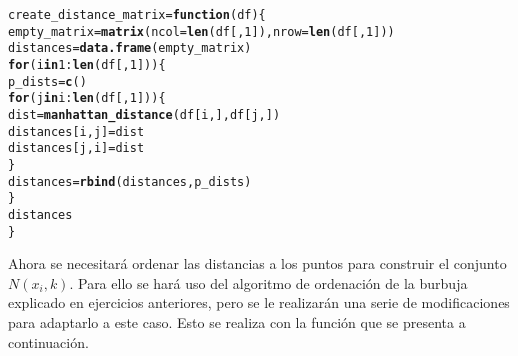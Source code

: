 \documentclass[12pt]{report}\usepackage[]{graphicx}\usepackage[dvipsnames]{xcolor}
\makeatletter
\newcommand{\hlnum}[1]{\textcolor[rgb]{0.686,0.059,0.569}{#1}}%
\newcommand{\hlopt}[1]{\textcolor[rgb]{0,0,0}{#1}}%
\newcommand{\hlstd}[1]{\textcolor[rgb]{0.345,0.345,0.345}{#1}}%
\newcommand{\hlkwa}[1]{\textcolor[rgb]{0.161,0.373,0.58}{\textbf{#1}}}%
\newcommand{\hlkwb}[1]{\textcolor[rgb]{0.69,0.353,0.396}{#1}}%
\newcommand{\hlkwc}[1]{\textcolor[rgb]{0.333,0.667,0.333}{#1}}%
\newcommand{\hlkwd}[1]{\textcolor[rgb]{0.737,0.353,0.396}{\textbf{#1}}}%
\newenvironment{kframe}{%
 \def\at@end@of@kframe{}%
 \ifinner\ifhmode%
  \def\at@end@of@kframe{\end{minipage}}%
  \begin{minipage}{\columnwidth}%
 \fi\fi%
 \def\FrameCommand##1{\hskip\@totalleftmargin \hskip-\fboxsep
 \colorbox{shadecolor}{##1}\hskip-\fboxsep
     \hskip-\linewidth \hskip-\@totalleftmargin \hskip\columnwidth}%
 \MakeFramed {\advance\hsize-\width
   \@totalleftmargin\z@ \linewidth\hsize
   \@setminipage}}%
 {\par\unskip\endMakeFramed%
 \at@end@of@kframe}
\newenvironment{knitrout}{}{} %
\makeatother
\begin{document}
\begin{knitrout}
\color{fgcolor}\begin{kframe}
\begin{alltt}
\hlstd{create_distance_matrix} \hlkwb{=} \hlkwa{function}\hlstd{(}\hlkwc{df}\hlstd{)\{}
        \hlstd{empty_matrix} \hlkwb{=} \hlkwd{matrix}\hlstd{(}\hlkwc{ncol} \hlstd{=} \hlkwd{len}\hlstd{(df[,}\hlnum{1}\hlstd{]),} \hlkwc{nrow} \hlstd{=} \hlkwd{len}\hlstd{(df[,}\hlnum{1}\hlstd{]))}
        \hlstd{distances} \hlkwb{=} \hlkwd{data.frame}\hlstd{(empty_matrix)}
        \hlkwa{for} \hlstd{(i} \hlkwa{in} \hlnum{1}\hlopt{:}\hlkwd{len}\hlstd{(df[,}\hlnum{1}\hlstd{]))\{}
                \hlstd{p_dists} \hlkwb{=} \hlkwd{c}\hlstd{()}
                \hlkwa{for} \hlstd{(j} \hlkwa{in} \hlstd{i}\hlopt{:}\hlkwd{len}\hlstd{(df[,}\hlnum{1}\hlstd{]))\{}
                        \hlstd{dist} \hlkwb{=} \hlkwd{manhattan_distance}\hlstd{(df[i,], df[j,])}
                        \hlstd{distances[i,j]} \hlkwb{=} \hlstd{dist}
                        \hlstd{distances[j,i]} \hlkwb{=} \hlstd{dist}
                \hlstd{\}}
                \hlstd{distances} \hlkwb{=} \hlkwd{rbind}\hlstd{(distances, p_dists)}
        \hlstd{\}}
        \hlstd{distances}
\hlstd{\}}
\end{alltt}
\end{kframe}
\end{knitrout}
					
					Ahora se necesitará ordenar las distancias a los puntos para construir el conjunto $N(x_i, k)$. Para ello se hará uso del algoritmo de ordenación de la burbuja explicado en ejercicios anteriores, pero se le realizarán una serie de modificaciones para adaptarlo a este caso. Esto se realiza con la función que se presenta a continuación. 
					
\end{document}
